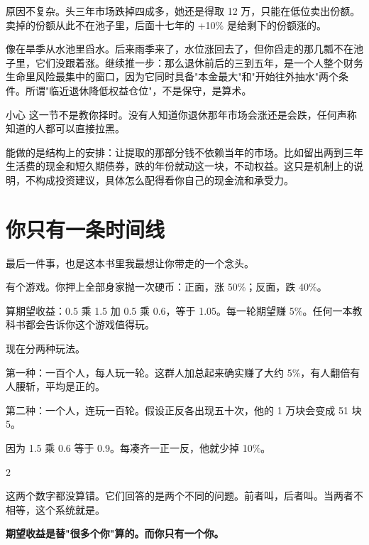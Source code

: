 原因不复杂。头三年市场跌掉四成多，她还是得取 12 万，只能在低位卖出份额。卖掉的份额从此不在池子里，后面十七年的 +10\% 是给剩下的份额涨的。

像在旱季从水池里舀水。后来雨季来了，水位涨回去了，但你舀走的那几瓢不在池子里，它们没跟着涨。继续推一步：那么退休前后的三到五年，是一个人整个财务生命里风险最集中的窗口，因为它同时具备"本金最大"和"开始往外抽水"两个条件。所谓"临近退休降低权益仓位"，不是保守，是算术。

\begin{warnbox}{小心}
这一节不是教你择时。没有人知道你退休那年市场会涨还是会跌，任何声称知道的人都可以直接拉黑。

能做的是结构上的安排：让提取的那部分钱不依赖当年的市场。比如留出两到三年生活费的现金和短久期债券，跌的年份就动这一块，不动权益。这只是机制上的说明，不构成投资建议，具体怎么配得看你自己的现金流和承受力。

\end{warnbox}

\section{你只有一条时间线}

最后一件事，也是这本书里我最想让你带走的一个念头。

有个游戏。你押上全部身家抛一次硬币：正面，涨 50\%；反面，跌 40\%。

算期望收益：0.5 乘 1.5 加 0.5 乘 0.6，等于 1.05。每一轮期望赚 5\%。任何一本教科书都会告诉你这个游戏值得玩。

现在分两种玩法。

第一种：一百个人，每人玩一轮。这群人加总起来确实赚了大约 5\%，有人翻倍有人腰斩，平均是正的。

第二种：一个人，连玩一百轮。假设正反各出现五十次，他的 1 万块会变成 51 块 5。

因为 1.5 乘 0.6 等于 0.9。每凑齐一正一反，他就少掉 10\%。

\begin{statrow}{2}
\end{statrow}

这两个数字都没算错。它们回答的是两个不同的问题。前者叫，后者叫。当两者不相等，这个系统就是。

\textbf{期望收益是替"很多个你"算的。而你只有一个你。}

